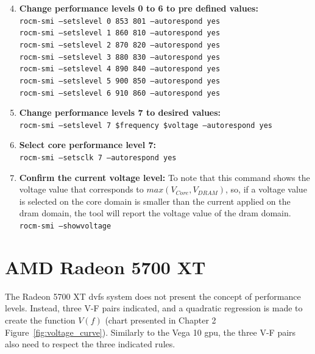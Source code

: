 \begin{enumerate}
\setcounter{enumi}{3}
\item \textbf{Change performance levels 0 to 6 to pre defined values:} \\
\texttt{rocm-smi --setslevel 0 853 801 --autorespond yes}\\
\texttt{rocm-smi --setslevel 1 860 810 --autorespond yes}\\
\texttt{rocm-smi --setslevel 2 870 820 --autorespond yes}\\
\texttt{rocm-smi --setslevel 3 880 830 --autorespond yes}\\
\texttt{rocm-smi --setslevel 4 890 840 --autorespond yes}\\
\texttt{rocm-smi --setslevel 5 900 850 --autorespond yes}\\
\texttt{rocm-smi --setslevel 6 910 860 --autorespond yes}
\item \textbf{Change performance levels 7 to desired values:} \\
\texttt{rocm-smi --setslevel 7 \$frequency \$voltage --autorespond yes}
\item \textbf{Select core performance level 7:} \\
\texttt{rocm-smi --setsclk 7 --autorespond yes}
\item \textbf{Confirm the current voltage level:} To note that this command shows the voltage value that corresponds to $max(V_{Core}, V_{DRAM})$, so, if a voltage value is selected on the core domain is smaller than the current applied on the \acrshort{dram} domain, the tool will report the voltage value of the \acrshort{dram} domain.\\
\texttt{rocm-smi --showvoltage}
\end{enumerate}




\section{AMD Radeon 5700 XT}

The Radeon 5700 XT \acrshort{dvfs} system does not present the concept of performance levels. Instead, three V-F pairs indicated, and a quadratic regression is made to create the function $V(f)$ (chart presented in Chapter 2 Figure~\ref{fig:voltage_curve}). Similarly to the Vega 10 \acrshort{gpu}, the three V-F pairs also need to respect the three indicated rules.

